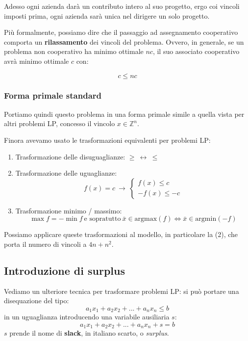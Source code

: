 \documentclass[a4paper,11pt]{article}
\begin{document}
Adesso ogni azienda darà un contributo intero al suo progetto, ergo coi vincoli imposti prima, ogni azienda sarà unica nel dirigere un solo progetto.

Più formalmente, possiamo dire che il passaggio ad assegnamento cooperativo comporta un \textbf{rilassamento} dei vincoli del problema.
Ovvero, in generale, se un problema non cooperativo ha minimo ottimale $nc$, il suo associato cooperativo avrà minimo ottimale $c$ con:

$$  c \leq nc $$

\subsubsection{Forma primale standard}
Portiamo quindi questo problema in una forma primale simile a quella vista per altri problemi LP, concesso il vincolo $x \in \mathbb{Z}^n$.

Finora avevamo usato le trasformazioni equivalenti per problemi LP:

\begin{enumerate}
	\item Trasformazione delle disuguaglianze: $ \geq \ \leftrightarrow \ \leq $
	\item Trasformazione delle uguaglianze:
		$$
			f(x) = c \ \rightarrow \
		\begin{cases}
			f(x) \leq c \\ 
			-f(x) \leq -c
		\end{cases}
		$$
	\item Trasformazione minimo / massimo: 
		$$
		\max{f} = -\min{f} \ \text{e sopratutto} \ 
		\bar{x} \in \mathrm{argmax}(f) \Leftrightarrow \bar{x} \in \mathrm{argmin}(-f)
		$$
\end{enumerate}

Possiamo applicare queste trasformazioni al modello, in particolare la (2), che porta il numero di vincoli a $4n + n^2$.

\subsection{Introduzione di surplus}
Vediamo un ulteriore tecnica per trasformare problemi LP: si può portare una disequazione del tipo:
$$ a_1x_1 + a_2x_2 + ... + a_nx_n \leq b $$
in un uguaglianza introducendo una variabile ausiliaria $s$:
$$ a_1x_1 + a_2x_2 + ... + a_nx_n + s = b $$
$s$ prende il nome di \textbf{slack}, in italiano scarto, o \textit{surplus}.
\end{document}
